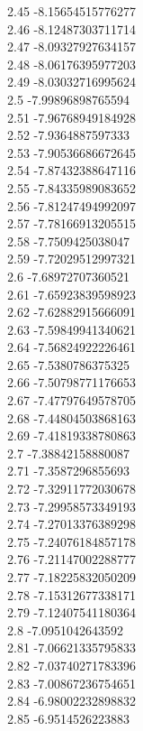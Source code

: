{2.45	-8.15654515776277\\
2.46	-8.12487303711714\\
2.47	-8.09327927634157\\
2.48	-8.06176395977203\\
2.49	-8.03032716995624\\
2.5	-7.99896898765594\\
2.51	-7.96768949184928\\
2.52	-7.9364887597333\\
2.53	-7.90536686672645\\
2.54	-7.87432388647116\\
2.55	-7.84335989083652\\
2.56	-7.81247494992097\\
2.57	-7.78166913205515\\
2.58	-7.7509425038047\\
2.59	-7.72029512997321\\
2.6	-7.68972707360521\\
2.61	-7.65923839598923\\
2.62	-7.62882915666091\\
2.63	-7.59849941340621\\
2.64	-7.56824922226461\\
2.65	-7.5380786375325\\
2.66	-7.50798771176653\\
2.67	-7.47797649578705\\
2.68	-7.44804503868163\\
2.69	-7.41819338780863\\
2.7	-7.38842158880087\\
2.71	-7.3587296855693\\
2.72	-7.32911772030678\\
2.73	-7.29958573349193\\
2.74	-7.27013376389298\\
2.75	-7.24076184857178\\
2.76	-7.21147002288777\\
2.77	-7.18225832050209\\
2.78	-7.15312677338171\\
2.79	-7.12407541180364\\
2.8	-7.0951042643592\\
2.81	-7.06621335795833\\
2.82	-7.03740271783396\\
2.83	-7.00867236754651\\
2.84	-6.98002232898832\\
2.85	-6.9514526223883\\
}
